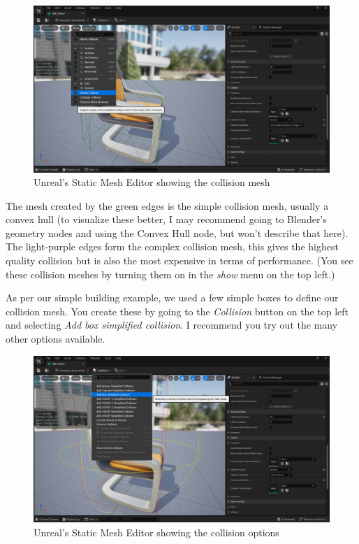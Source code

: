 \documentclass{article}
\begin{document}
\begin{figure}[h]
    \centering
    \includegraphics[width=1\textwidth]{week1/image003.png}
    \caption{Unreal's Static Mesh Editor showing the collision mesh}
    \label{fig:unreal_static_mesh_editor}
\end{figure}

The mesh created by the green edges is the simple collision mesh, usually a convex hull (to visualize these better, I may recommend going to Blender's geometry nodes and using the Convex Hull node, but won't describe that here). The light-purple edges form the complex collision mesh, this gives the highest quality collision but is also the most expensive in terms of performance. (You see these collision meshes by turning them on in the \emph{show} menu on the top left.)

As per our simple building example, we used a few simple boxes to define our collision mesh. You create these by going to the \emph{Collision} button on the top left and selecting \emph{Add box simplified collision}. I recommend you try out the many other options available.

\begin{figure}[h]
    \centering
    \includegraphics[width=1\textwidth]{week1/image004.png}
    \caption{Unreal's Static Mesh Editor showing the collision options}
    \label{fig:unreal_collision_options}
\end{figure}
\end{document}
